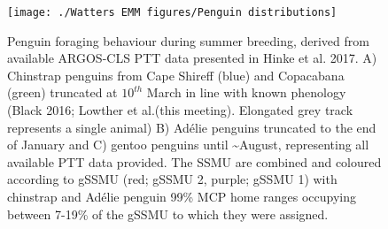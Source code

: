 \documentclass[]{elsarticle} %
\begin{document}
\begin{table}[ht]
\centering
{}
\caption{Summary Table showing what was bullshit, and where to find the analysis and data in our paper.}
\end{table}

\begin{figure}
\texttt{[image: ./Watters EMM figures/Penguin distributions]} \caption{Penguin foraging behaviour during summer breeding, derived from available ARGOS-CLS PTT data presented in Hinke et al. 2017. A) Chinstrap penguins from Cape Shireff (blue) and Copacabana (green) truncated at $10^{th}$ March in line with known phenology (Black 2016; Lowther et al.(this meeting).  Elongated grey track represents a single animal) B) Adélie penguins truncated to the end of January and C) gentoo penguins until \textasciitilde{}August, representing all available PTT data provided. The SSMU are combined and coloured according to gSSMU (red; gSSMU 2, purple; gSSMU 1) with chinstrap and Adélie penguin 99\% MCP home ranges occupying between 7-19\% of the gSSMU to which they were assigned.}\label{fig:Penguin distribution plots}
\end{figure}
\end{document}
